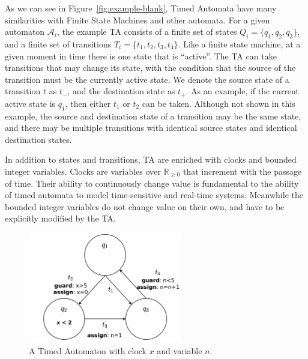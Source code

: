 \documentclass[a4paper,11pt]{report}
\theoremstyle{definition}
\begin{document}
As we can see in Figure~\ref{fig:example-blank}, Timed Automata have many
similarities with Finite State Machines and other automata. For a given
automaton $\mathcal{A}_{i}$, the example TA consists of a finite set of states
$Q_{i} = \{q_{1},q_{2},q_{3}\}$, and a finite set of transitions
$T_{i} = \{t_{1},t_{2},t_{3},t_{4}\}$. Like a finite state machine, at a given
moment in time there is one state that is ``active''. The TA can take
transitions that may change its state, with the condition that the source of the
transition must be the currently active state. We denote the source state of a
transition $t$ as $t_{-}$, and the destination state as $t_{+}$. As an example,
if the current active state is $q_{1}$, then either $t_{1}$ or $t_{2}$ can be
taken. Although not shown in this example, the source and destination state of a
transition may be the same state, and there may be multiple transitions with
identical source states and identical destination states.

In addition to states and transitions, TA are enriched with clocks and bounded
integer variables. Clocks are variables over $\mathbb{R}_{\geq 0}$ that increment with the
passage of time. Their ability to continuously change value is fundamental to
the ability of timed automata to model time-sensitive and real-time systems.
Meanwhile the bounded integer variables do not change value on their own, and
have to be explicitly modified by the TA.

\begin{figure}[h]
  \centering
  \includegraphics[width=0.6\textwidth]{minTA-big}
  \caption{A Timed Automaton with clock $x$ and variable $n$.}
  \label{fig:example-big}
\end{figure}
\end{document}

